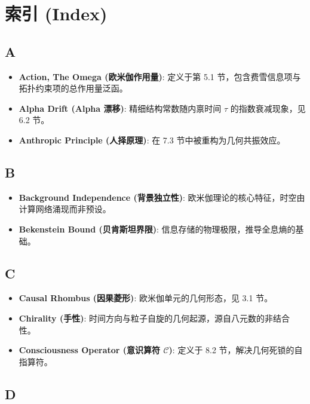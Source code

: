 \hrulefill

\section{索引 (Index)}

\subsection{A}

\begin{itemize}
\item \textbf{Action, The Omega (欧米伽作用量)}: 定义于第 5.1 节，包含费雪信息项与拓扑约束项的总作用量泛函。
\item \textbf{Alpha Drift (Alpha 漂移)}: 精细结构常数随内禀时间 $\tau$ 的指数衰减现象，见 6.2 节。
\item \textbf{Anthropic Principle (人择原理)}: 在 7.3 节中被重构为几何共振效应。
\end{itemize}

\subsection{B}

\begin{itemize}
\item \textbf{Background Independence (背景独立性)}: 欧米伽理论的核心特征，时空由计算网络涌现而非预设。
\item \textbf{Bekenstein Bound (贝肯斯坦界限)}: 信息存储的物理极限，推导全息熵的基础。
\end{itemize}

\subsection{C}

\begin{itemize}
\item \textbf{Causal Rhombus (因果菱形)}: 欧米伽单元的几何形态，见 3.1 节。
\item \textbf{Chirality (手性)}: 时间方向与粒子自旋的几何起源，源自八元数的非结合性。
\item \textbf{Consciousness Operator (意识算符 $\hat{\mathcal{C}}$)}: 定义于 8.2 节，解决几何死锁的自指算符。
\end{itemize}

\subsection{D}

